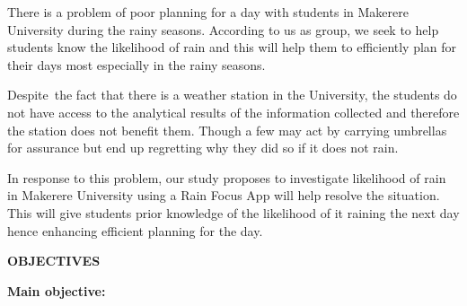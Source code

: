 \documentclass[12pt]{article}
\begin{document}
{\fontsize{13pt}{15.6pt}\selectfont There is a problem of poor planning for a day with students in Makerere University during the rainy seasons. According to us as group, we seek to help students know the likelihood of rain and this will help them to efficiently plan for their days most especially in the rainy seasons.\par}\par

{\fontsize{13pt}{15.6pt}\selectfont Despite\ the fact that there is a weather station in the University, the students do not have access to the analytical results of the information collected and therefore the station does not benefit them. Though a few may act by carrying umbrellas for assurance but end up regretting why they did so if it does not rain.  \par}\par

{\fontsize{13pt}{15.6pt}\selectfont In response to this problem, our study proposes to investigate likelihood of rain in Makerere University using a Rain Focus App will help resolve the situation. This will give students prior knowledge of the likelihood of it raining the next day hence enhancing efficient planning for the day.\par}\par


\vspace{\baselineskip}
\begin{Center}
{\fontsize{13pt}{15.6pt}\selectfont \textbf{OBJECTIVES}\par}
\end{Center}\par


\vspace{\baselineskip}
{\fontsize{13pt}{15.6pt}\selectfont \textbf{Main objective:}\par}\par
\end{document}
